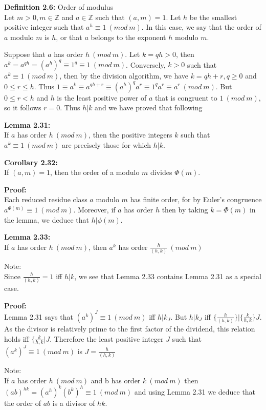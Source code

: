 \documentclass[a4paper]{article}
\begin{document}
\textbf{Definition 2.6:} Order of modulus\\
Let $m>0, m\in\mathbb{Z}$ and $a\in\mathbb{Z}$ such that $(a,m)=1$. Let $h$ be the smallest positive integer such that $a^h\equiv 1\ (mod\ m)$. In this case, we say that the order of $a$ modulo $m$ is $h$, or that $a$ belongs to the exponent $h$ modulo $m$.

Suppose that $a$ has order $h\ (mod\ m)$. Let $k=qh>0$, then $a^k=a^{qh}=(a^h)^q\equiv 1^q\equiv 1\ (mod\ m)$.
Conversely, $k>0$ such that $a^k\equiv 1\ (mod\ m)$, then by the division algorithm, we have $k=qh+r, q\geq0$ and $0\leq r\leq h$. Thus $1\equiv a^k\equiv a^{qh+r}\equiv (a^h)^qa^r\equiv 1^qa^r\equiv a^r\ (mod\ m)$. But $0\leq r<h$ and $h$ is the least positive power of $a$ that is congruent to $1\ (mod\ m)$, so it follows $r=0$. Thus $h|k$ and we have proved that following

\textbf{Lemma 2.31:}\\
If $a$ has order $h\ (mod\ m)$, then the positive integers $k$ such that $a^k\equiv 1\ (mod\ m)$ are precisely those for which $h|k$.

\textbf{Corollary 2.32:}\\
If $(a,m)=1$, then the order of a modulo $m$ divides $\Phi(m)$.

\textbf{Proof:}\\
Each reduced residue class $a$ modulo $m$ has finite order, for by Euler's congruence $a^{\Phi(m)}\equiv 1\ (mod\ m)$. Moreover, if $a$ has order $h$ then by taking $k=\Phi(m)$ in the lemma, we deduce that $h|\phi(m)$.

\textbf{Lemma 2.33:}\\
If $a$ has order $h\ (mod\ m)$, then $a^k$ has order $\frac{h}{(h,k)}\ (mod\ m)$

Note:\\
Since $\frac{h}{(h,k)}=1$ iff $h|k$, we see that Lemma 2.33 contains Lemma 2.31 as a special case.

\textbf{Proof:}\\
Lemma 2.31 says that $(a^k)^J\equiv 1\ (mod\ m)$ iff $h|k_J$. But $h|k_J$ iff $\{\frac{h}{(h,k)}\}|\{\frac{k}{h,k}\}J$. As the divisor is relatively prime to the first factor of the dividend, this relation holds iff $\{\frac{k}{h,k}|J$. Therefore the least positive integer $J$ such that $(a^k)^J\equiv 1\ (mod\ m)$ is $J=\frac{h}{(h,k)}$

Note:\\
If $a$ has order $h\ (mod\ m)$ and b has order $k\ (mod\ m)$ then $(ab)^{hk}=(a^h)^k(b^k)^h\equiv 1\ (mod\ m)$ and using Lemma 2.31 we deduce that the order of $ab$ is a divisor of $hk$.
\end{document}
